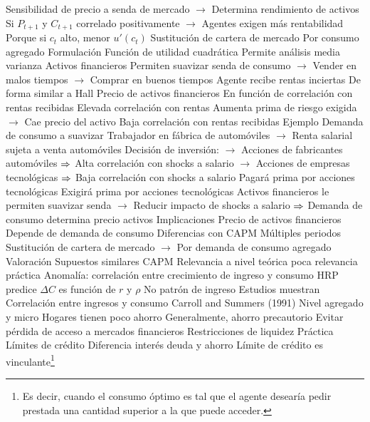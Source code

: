 \documentclass{nuevotema}
\begin{document}
\begin{esquemal}
				\4[] Sensibilidad de precio a senda de mercado
				\4[] $\to$ Determina rendimiento de activos
				\4[] Si $P_{t+1}$ y $C_{t+1}$ correlado positivamente
				\4[] $\to$ Agentes exigen más rentabilidad
				\4[] Porque si $c_t$ alto, menor $u'(c_t)$
				\4[] Sustitución de cartera de mercado
				\4[] Por consumo agregado
			\3 Formulación
				\4 Función de utilidad cuadrática
				\4[] Permite análisis media varianza
				\4 Activos financieros
				\4[] Permiten suavizar senda de consumo
				\4[] $\to$ Vender en malos tiempos
				\4[] $\to$ Comprar en buenos tiempos
				\4 Agente recibe rentas inciertas
				\4[] De forma similar a Hall
				\4 Precio de activos financieros
				\4[] En función de correlación con rentas recibidas
				\4 Elevada correlación con rentas
				\4[] Aumenta prima de riesgo exigida
				\4[] $\to$ Cae precio del activo
				\4 Baja correlación con rentas recibidas
				\4 Ejemplo
				\4[] Demanda de consumo a suavizar
				\4[] Trabajador en fábrica de automóviles
				\4[] $\to$ Renta salarial sujeta a venta automóviles
				\4[] Decisión de inversión:
				\4[] $\to$ Acciones de fabricantes automóviles
				\4[] $\Rightarrow$ Alta correlación con shocks a salario
				\4[] $\to$ Acciones de empresas tecnológicas
				\4[] $\Rightarrow$ Baja correlación con shocks a salario
				\4[] Pagará prima por acciones tecnológicas
				\4[] Exigirá prima por acciones tecnológicas
				\4[] Activos financieros le permiten suavizar senda
				\4[] $\to$ Reducir impacto de shocks a salario
				\4[] $\Rightarrow$ Demanda de consumo determina precio activos
			\3 Implicaciones
				\4 Precio de activos financieros
				\4[] Depende de demanda de consumo
				\4 Diferencias con CAPM
				\4[] Múltiples periodos
				\4[] Sustitución de cartera de mercado
				\4[] $\to$ Por demanda de consumo agregado
			\3 Valoración
				\4 Supuestos similares CAPM
				\4 Relevancia a nivel teórica
				\4 [] poca relevancia práctica
		\2 Anomalía: correlación entre crecimiento de ingreso y consumo
			\3 HRP predice
				\4 $\varDelta C$ es función de $r$ y $\rho$
				\4[] No patrón de ingreso
			\3 Estudios muestran
				\4 Correlación entre ingresos y consumo
				\4 Carroll and Summers (1991)
				\4 Nivel agregado y micro
				\4 Hogares tienen poco ahorro
				\4 Generalmente, ahorro precautorio
				\4[] Evitar pérdida de acceso a mercados financieros
		\2 Restricciones de liquidez
			\3 Práctica
				\4 Límites de crédito
				\4 Diferencia interés deuda y ahorro
			\3 Límite de crédito es vinculante\footnote{Es decir, cuando el consumo óptimo es tal que el agente desearía pedir prestada una cantidad superior a la que puede acceder.}

\end{esquemal}
\end{document}
